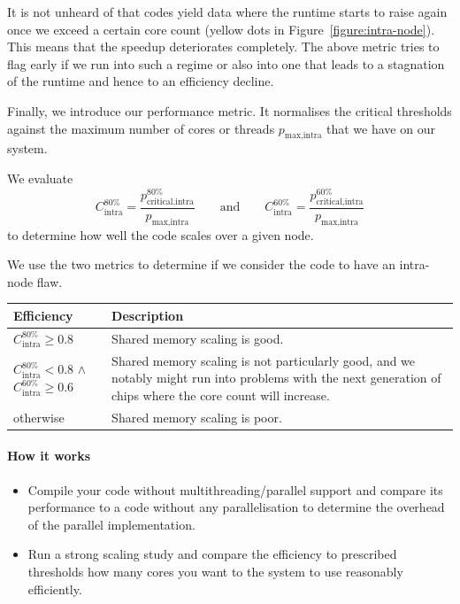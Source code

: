 \noindent
It is not unheard of that codes yield data where the runtime starts to raise again once we exceed a certain core count (yellow dots in Figure~\ref{figure:intra-node}).
This means that the speedup deteriorates completely.
The above metric tries to flag early if we run into such a regime or also into one that leads to a stagnation of the runtime and hence to an efficiency decline.


Finally, we introduce our performance metric.
It normalises the critical thresholds against the maximum number of cores or threads $p_{\text{max,intra}}$ that we have on our system.
 
\begin{performancemetric}
 We evaluate 
 \[
  C_{\text{intra}}^{\text{80\%}} = \frac{ p_{\text{critical,intra}}^{\text{80\%}} }{ p_{\text{max,intra}} }
  \qquad
  \text{and}
  \qquad
  C_{\text{intra}}^{\text{60\%}} = \frac{ p_{\text{critical,intra}}^{\text{60\%}} }{ p_{\text{max,intra}} }
 \]
 \noindent
 to determine how well the code scales over a given node.
\end{performancemetric}

\noindent
We use the two metrics to determine if we consider the code to have an intra-node
flaw.

\begin{center}
 \begin{tabular}{p{}p{}}
  Efficiency & Description \\
  \hline
  $C_{\text{intra}}^{\text{80\%}} \geq 0.8$
   & \cellcolor{green!25} Shared memory scaling is good.
  \\
  $C_{\text{intra}}^{\text{80\%}} < 0.8$ $\wedge $
  $C_{\text{intra}}^{\text{60\%}} \geq 0.6$
   & \cellcolor{yellow!25} Shared memory scaling is not particularly good, and
   we notably might run into problems with the next generation of chips where
   the core count will increase.
  \\
  otherwise
   & \cellcolor{red!25} Shared memory scaling is poor.
 \end{tabular}
\end{center}


\paragraph*{How it works}

\begin{itemize}[noitemsep]
  \item[$\boxplus$] Compile your code without multithreading/parallel support and compare its performance to a code without any parallelisation to determine the overhead of the parallel implementation.
  \item[$\boxplus$] Run a strong scaling study and compare the efficiency to prescribed thresholds how many cores you want to the system to use reasonably efficiently. 
\end{itemize}



